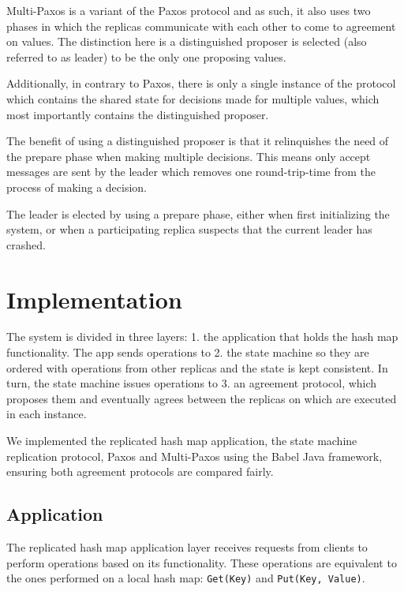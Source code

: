 \documentclass[sigconf]{acmart}
\begin{document}

Multi-Paxos is a variant of the Paxos protocol and as such, it also uses two phases in which the replicas communicate with each other to come to agreement on values. The distinction here is a distinguished proposer is selected (also referred to as leader) to be the only one proposing values.

Additionally, in contrary to Paxos, there is only a single instance of the protocol which contains the shared state for decisions made for multiple values, which most importantly contains the distinguished proposer.

The benefit of using a distinguished proposer is that it relinquishes the need of the prepare phase when making multiple decisions. This means only accept messages are sent by the leader which removes one round-trip-time from the process of making a decision.

The leader is elected by using a prepare phase, either when first initializing the system, or when a participating replica suspects that the current leader has crashed.


\section{Implementation}

The system is divided in three layers: 1. the application that holds the hash map functionality. The app sends operations to 2. the state machine so they are ordered with operations from other replicas and the state is kept consistent. In turn, the state machine issues operations to 3. an agreement protocol, which proposes them and eventually agrees between the replicas on which are executed in each instance.

We implemented the replicated hash map application, the state machine replication protocol, Paxos and Multi-Paxos using the Babel Java framework, ensuring both agreement protocols are compared fairly.

\subsection{Application}

The replicated hash map application layer receives requests from clients to perform operations based on its functionality. These operations are equivalent to the ones performed on a local hash map: \texttt{Get(Key)} and \texttt{Put(Key, Value)}. 
\end{document}
